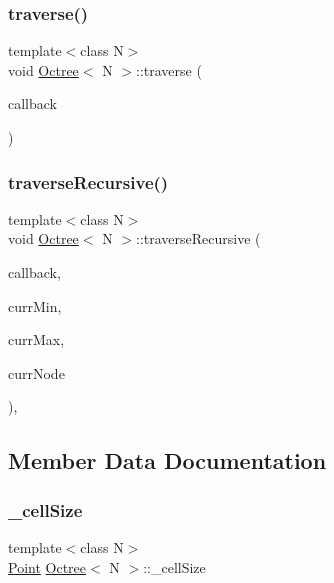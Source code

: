 \subsubsection{\texorpdfstring{traverse()}{traverse()}}
{\footnotesize\ttfamily template$<$class N$>$ \\
void \hyperlink{classOctree}{Octree}$<$ N $>$\+::traverse (\begin{DoxyParamCaption}\item[{\hyperlink{classOctree_1_1Callback}{Callback} $\ast$}]{callback }\end{DoxyParamCaption})\hspace{0.3cm}{\ttfamily [inline]}}

\mbox{\label{classOctree_a2f7949797701cd01d398a76c323ec845}} 
\subsubsection{\texorpdfstring{traverse\+Recursive()}{traverseRecursive()}}
{\footnotesize\ttfamily template$<$class N$>$ \\
void \hyperlink{classOctree}{Octree}$<$ N $>$\+::traverse\+Recursive (\begin{DoxyParamCaption}\item[{\hyperlink{classOctree_1_1Callback}{Callback} $\ast$}]{callback,  }\item[{const \hyperlink{structOctree_1_1Point}{Point} \&}]{curr\+Min,  }\item[{const \hyperlink{structOctree_1_1Point}{Point} \&}]{curr\+Max,  }\item[{\hyperlink{structOctree_1_1OctreeNode}{Octree\+Node} $\ast$}]{curr\+Node }\end{DoxyParamCaption})\hspace{0.3cm}{\ttfamily [inline]}, {\ttfamily [protected]}}



\subsection{Member Data Documentation}
\mbox{\label{classOctree_a6b398a3bf87d71dabc6b72180a551f0b}} 
\subsubsection{\texorpdfstring{\+\_\+cell\+Size}{\_cellSize}}
{\footnotesize\ttfamily template$<$class N$>$ \\
\hyperlink{structOctree_1_1Point}{Point} \hyperlink{classOctree}{Octree}$<$ N $>$\+::\+\_\+cell\+Size\hspace{0.3cm}{\ttfamily [protected]}}

